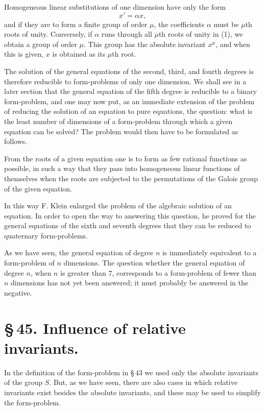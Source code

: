 \documentclass[11pt]{article}
\begin{document}
Homogeneous linear substitutions of one dimension have only the form
\begin{equation}
x'=\alpha x,
\tag{1}
\end{equation}
and if they are to form a finite group of order $\mu$, the coefficients $\alpha$ must be $\mu$th roots of unity. Conversely, if $\alpha$ runs through all $\mu$th roots of unity in (1), we obtain a group of order $\mu$. This group has the absolute invariant $x^\mu$, and when this is given, $x$ is obtained as its $\mu$th root.

\clearpage


The solution of the general equations of the second, third, and fourth degrees is therefore reducible to form-problems of only one dimension. We shall see in a later section that the general equation of the fifth degree is reducible to a binary form-problem, and one may now put, as an immediate extension of the problem of reducing the solution of an equation to pure equations, the question: what is the least number of dimensions of a form-problem through which a given equation can be solved? The problem would then have to be formulated as follows.

From the roots of a given equation one is to form as few rational functions as possible, in such a way that they pass into homogeneous linear functions of themselves when the roots are subjected to the permutations of the Galois group of the given equation.

In this way F. Klein enlarged the problem of the algebraic solution of an equation. In order to open the way to answering this question, he proved for the general equations of the sixth and seventh degrees that they can be reduced to quaternary form-problems.

As we have seen, the general equation of degree $n$ is immediately equivalent to a form-problem of $n$ dimensions. The question whether the general equation of degree $n$, when $n$ is greater than $7$, corresponds to a form-problem of fewer than $n$ dimensions has not yet been answered; it must probably be answered in the negative.

\section*{\S\,45. Influence of relative invariants.}

In the definition of the form-problem in \S\,43 we used only the absolute invariants of the group $S$. But, as we have seen, there are also cases in which relative invariants exist besides the absolute invariants, and these may be used to simplify the form-problem.
\end{document}

